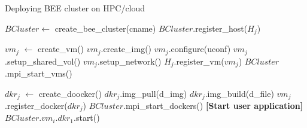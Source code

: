 \begin{algorithm}
\caption{Deploying BEE cluster on HPC/cloud}
\label{bee-launch}
\begin{algorithmic}[1]

\STATE $BCluster \leftarrow$ create\_bee\_cluster(cname)
	\STATE $BCluster$.register\_host($H_j$)
\ENDFOR

	\STATE $vm_j$ $\leftarrow$ create\_vm()
	\STATE $vm_j$.create\_img() 
	\STATE $vm_j$.configure(uconf) 
	\STATE $vm_j$.setup\_shared\_vol()
	\STATE $vm_j$.setup\_network()
	\STATE $H_j$.register\_vm($vm_j$)
\ENDFOR
\STATE $BCluster$.mpi\_start\_vms()

	\STATE $dkr_j$ $\leftarrow$ create\_doocker()
		\STATE $dkr_j$.img\_pull(d\_img)
	\ELSE
		\STATE $dkr_j$.img\_build(d\_file)
    \ENDIF
	$vm_j$.register\_docker($dkr_j$)
\ENDFOR
\STATE $BCluster$.mpi\_start\_dockers()
\STATE \textbf{[Start user application]}
\STATE $BCluster$.$vm_i$.$dkr_1$.start()

\end{algorithmic}
\end{algorithm}

